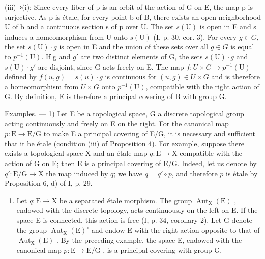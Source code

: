 (iii)⇒(i): Since every fiber of p is an orbit of the action of G on E, the map p is surjective. As p is étale, for every point b of B, there exists an open neighborhood U of b and a continuous section s of p over U. The set \(s(\mathrm{U})\) is open in E and s induces a homeomorphism from U onto \(s(\mathrm{U})\) (I, p. 30, cor. 3). For every \(g \in G\), the set \(s(\mathrm{U}) \cdot g\) is open in E and the union of these sets over all \(g \in G\) is equal to \(p^{-1}(\mathrm{U})\). If g and \(g'\) are two distinct elements of G, the sets \(s(\mathrm{U}) \cdot g\) and \(s(\mathrm{U}) \cdot g'\) are disjoint, since G acts freely on E. The map \(f: U \times G \to p^{-1}(\mathrm{U})\) defined by \(f(u, g) = s(u) \cdot g\) is continuous for \((u, g) \in U \times G\) and is therefore a homeomorphism from \(U \times G\) onto \(p^{-1}(\mathrm{U})\), compatible with the right action of G. By definition, E is therefore a principal covering of B with group G.

Examples. --- 1) Let E be a topological space, G a discrete topological group acting continuously and freely on E on the right. For the canonical map \(p \colon \mathrm{E} \to \mathrm{E} / \mathrm{G}\) to make E a principal covering of E/G, it is necessary and sufficient that it be étale (condition (iii) of Proposition 4). For example, suppose there exists a topological space X and an étale map \(q \colon \mathrm{E} \to \mathrm{X}\) compatible with the action of G on E; then E is a principal covering of E/G. Indeed, let us denote by \(q' \colon \mathrm{E} / \mathrm{G} \to \mathrm{X}\) the map induced by \(q\); we have \(q = q' \circ p\), and therefore \(p\) is étale by Proposition 6, d) of I, p. 29.

\begin{enumerate}
\def\labelenumi{\arabic{enumi})}
\setcounter{enumi}{1}
\tightlist
\item
  Let \(q \colon \mathrm{E} \to \mathrm{X}\) be a separated étale morphism. The group \(\operatorname{Aut}_{\mathrm{X}}(\mathrm{E})\) , endowed with the discrete topology, acts continuously on the left on E. If the space E is connected, this action is free (I, p. 34, corollary 2). Let G denote the group \(\operatorname{Aut}_{\mathrm{X}}(\mathrm{E})^{\circ}\) and endow E with the right action opposite to that of \(\operatorname{Aut}_{\mathrm{X}}(\mathrm{E})\) . By the preceding example, the space E, endowed with the canonical map \(p \colon \mathrm{E} \to \mathrm{E} / \mathrm{G}\) , is a principal covering with group G.
\end{enumerate}

